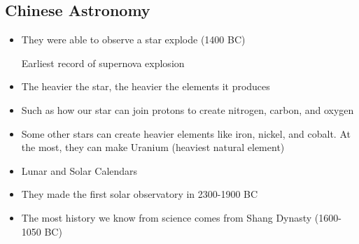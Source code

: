 \documentclass{article}
\begin{document}
\subsection{Chinese Astronomy}
\begin{itemize}
  \item They were able to observe a star explode (1400 BC)

    Earliest record of supernova explosion
  \item The heavier the star, the heavier the elements it produces
  \item Such as how our star can join protons to create nitrogen, carbon, and oxygen
  \item Some other stars can create heavier elements like iron, nickel, and cobalt.
    At the most, they can make Uranium (heaviest natural element)
  \item Lunar and Solar Calendars
  \item They made the first solar observatory in 2300-1900 BC
  \item The most history we know from science comes from Shang Dynasty (1600-1050 BC)
\end{itemize}
\end{document}

